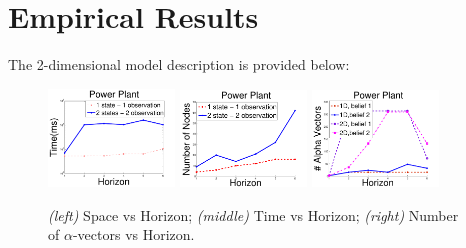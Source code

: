 \documentclass{article} %
\begin{document}
\section{Empirical Results}
The 2-dimensional model description is provided below:
\begin{figure}[tbp!]
\vspace{-2mm}
\centering
\includegraphics[width=0.3\textwidth]{pics/time2.pdf}
\includegraphics[width=0.3\textwidth]{pics/nodes2.pdf}
\includegraphics[width=0.3\textwidth]{pics/alpha-vectors2.pdf}
\vspace{-3mm}
\caption{\footnotesize 
{\it (left)} Space vs Horizon; 
{\it (middle)} Time vs Horizon; 
{\it (right)} Number of $\alpha$-vectors vs Horizon.
}
\label{fig:timeSpace}
\vspace{-4mm}
\end{figure}
\end{document}
